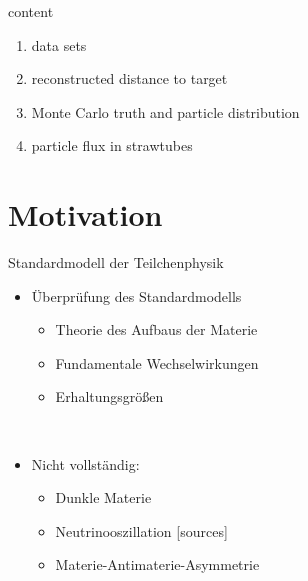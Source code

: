 



\maketitle


\begin{frame}[t]{content}
  \begin{enumerate} \setlength\itemsep{0.5cm}
    \item {\Large data sets}
    \item {\Large reconstructed distance to target}
    \item {\Large Monte Carlo truth and particle distribution}
    \item {\Large particle flux in strawtubes}
  \end{enumerate}
\end{frame}

\section{Motivation}
\begin{frame}[t]{Standardmodell der Teilchenphysik}
  \begin{multicols}{2}
      \begin{itemize}
        \item Überprüfung des Standardmodells
        \begin{itemize}
          \item Theorie des Aufbaus der Materie
          \item Fundamentale Wechselwirkungen
          \item Erhaltungsgrößen
        \end{itemize}
      \end{itemize}
      \ \\
      \begin{itemize}
        \item Nicht vollständig:
        \begin{itemize}
          \item Dunkle Materie
          \item Neutrinooszillation [sources]
          \item Materie-Antimaterie-Asymmetrie
        \end{itemize}
      \end{itemize}
  \end{multicols}
\end{frame}

